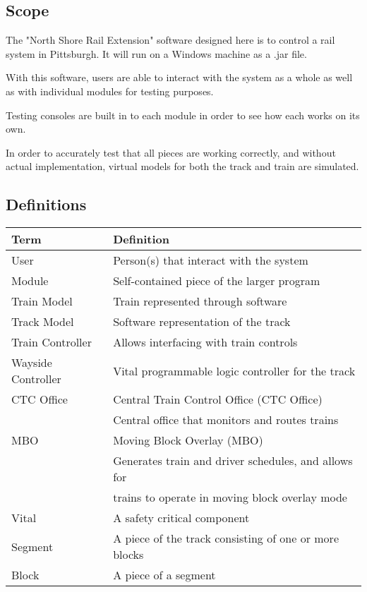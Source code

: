 \documentclass[11pt]{article}
\begin{document}
\subsection{Scope}
\label{sec-1-2}

The "North Shore Rail Extension" software designed here is to control a rail system in Pittsburgh. It will run on a Windows machine as a .jar file. 

With this software, users are able to interact with the  system as a whole as well as with individual modules for testing purposes.

Testing consoles are built in to each module in order to see how each works on its own.

In order to accurately test that all pieces are working correctly, and without actual implementation, virtual models for both the track and train are simulated.
\subsection{Definitions}
\label{sec-1-3}
\begin{center}
\begin{tabular}{ll}
Term & Definition\\
\hline
User & Person(s) that interact with the system\\
Module & Self-contained piece of the larger program\\
Train Model & Train represented through software\\
Track Model & Software representation of the track\\
Train Controller & Allows interfacing with train controls\\
Wayside Controller & Vital programmable logic controller for the track\\
CTC Office & Central Train Control Office (CTC Office)\\
 & Central office that monitors and routes trains\\
MBO & Moving Block Overlay (MBO)\\
 & Generates train and driver schedules, and allows for\\
 & trains to operate in moving block overlay mode\\
Vital & A safety critical component\\
Segment & A piece of the track consisting of one or more blocks\\
Block & A piece of a segment\\
\end{tabular}
\end{center}
\end{document}
